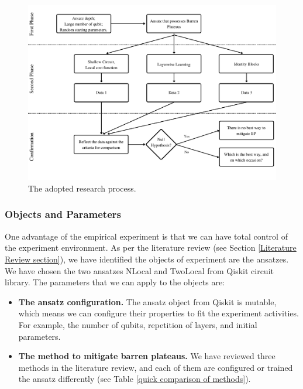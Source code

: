 \begin{figure}
    \centering
    \includegraphics[width=\textwidth]{./ResearchDesign/Appendices/Method.png}
    \caption{
        The adopted research process.
    }
    \label{Research Activities}
\end{figure}

\subsubsection{Objects and Parameters}\label{Objects section}
One advantage of the empirical experiment is that we can have total control of the experiment environment.
As per the literature review (see Section \ref{Literature Review section}), we have identified the  objects of experiment are the ansatzes.
We have chosen the two ansatzes NLocal and TwoLocal from Qiskit circuit library.
The parameters that we can apply to the objects are:
\begin{itemize}
    \item \textbf{The ansatz configuration.} The ansatz object from Qiskit is mutable, which means we can configure their properties to fit the experiment activities. For example, the number of qubits, repetition of layers, and initial parameters.
    \item \textbf{The method to mitigate barren plateaus.} We have reviewed three methods in the literature review, and each of them are configured or trained the ansatz differently (see Table \ref{quick comparison of methods}).
\end{itemize}

